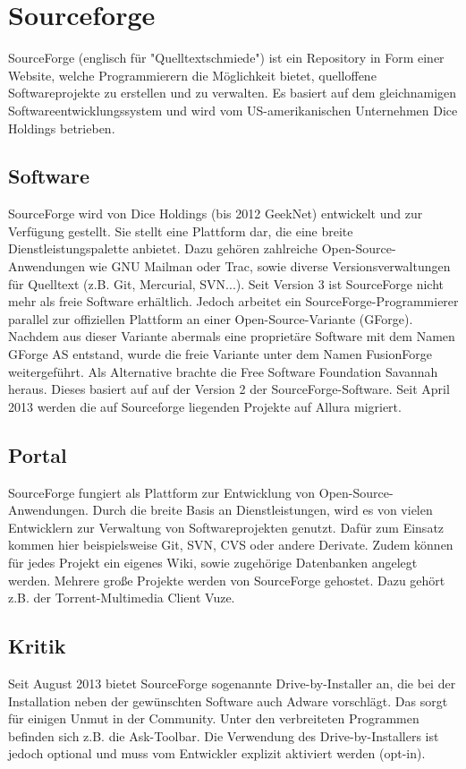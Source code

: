 \section{Sourceforge}
SourceForge (englisch für "Quelltextschmiede") ist ein Repository in Form einer Website,
welche Programmierern die Möglichkeit bietet, quelloffene Softwareprojekte zu erstellen und zu verwalten. 
Es basiert auf dem gleichnamigen Softwareentwicklungssystem und wird vom US-amerikanischen Unternehmen 
Dice Holdings betrieben.
\subsection{Software}
SourceForge wird von Dice Holdings (bis 2012 GeekNet) entwickelt und zur Verfügung gestellt.
Sie stellt eine Plattform dar, die eine breite Dienstleistungspalette anbietet. Dazu gehören zahlreiche Open-Source-Anwendungen
wie GNU Mailman oder Trac, sowie diverse Versionsverwaltungen für Quelltext (z.B. Git, Mercurial, SVN...).
Seit Version 3 ist SourceForge nicht mehr als freie Software erhältlich. Jedoch arbeitet ein SourceForge-Programmierer
parallel zur offiziellen Plattform an einer Open-Source-Variante (GForge). Nachdem aus dieser Variante 
abermals eine proprietäre Software mit dem Namen GForge AS entstand, wurde die freie Variante unter dem Namen FusionForge
weitergeführt. Als Alternative brachte die Free Software Foundation Savannah heraus. Dieses basiert auf
auf der Version 2 der SourceForge-Software.
Seit April 2013 werden die auf Sourceforge liegenden Projekte auf Allura migriert.
\subsection{Portal}
SourceForge fungiert als Plattform zur Entwicklung von Open-Source-Anwendungen. Durch die breite Basis an
Dienstleistungen, wird es von vielen Entwicklern zur Verwaltung von Softwareprojekten genutzt. Dafür zum Einsatz kommen
hier beispielsweise Git, SVN, CVS oder andere Derivate. Zudem können für jedes Projekt
ein eigenes Wiki, sowie zugehörige Datenbanken angelegt werden.
Mehrere große Projekte werden von SourceForge gehostet. Dazu gehört z.B. der Torrent-Multimedia Client Vuze.
\subsection{Kritik}
Seit August 2013 bietet SourceForge sogenannte Drive-by-Installer an, die bei der Installation 
neben der gewünschten Software auch Adware vorschlägt. Das sorgt für einigen Unmut in der Community. 
Unter den verbreiteten Programmen befinden sich z.B. die Ask-Toolbar. Die Verwendung des
Drive-by-Installers ist jedoch optional und muss vom Entwickler explizit aktiviert werden (opt-in).

